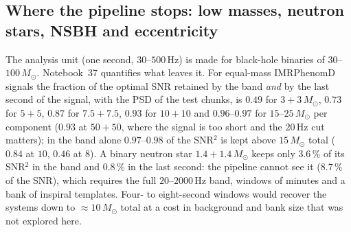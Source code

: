 \subsection{Where the pipeline stops: low masses, neutron stars, NSBH and eccentricity}\label{sec:limits}
The analysis unit (one second, $30$--$500\,$Hz) is made for black-hole binaries of $30$--$100\,M_\odot$. Notebook~37 quantifies what leaves it. For equal-mass IMRPhenomD signals the fraction of the optimal SNR retained by the band \emph{and} by the last second of the signal, with the PSD of the test chunks, is $0.49$ for $3+3\,M_\odot$, $0.73$ for $5+5$, $0.87$ for $7.5+7.5$, $0.93$ for $10+10$ and $0.96$--$0.97$ for $15$--$25\,M_\odot$ per component ($0.93$ at $50+50$, where the signal is too short and the $20\,$Hz cut matters); in the band alone $0.97$--$0.98$ of the SNR$^2$ is kept above $15\,M_\odot$ total ($0.84$ at $10$, $0.46$ at $8$). A binary neutron star $1.4+1.4\,M_\odot$ keeps only $3.6\,\%$ of its SNR$^2$ in the band and $0.8\,\%$ in the last second: the pipeline cannot see it ($8.7\,\%$ of the SNR), which requires the full $20$--$2000\,$Hz band, windows of minutes and a bank of inspiral templates. Four- to eight-second windows would recover the systems down to $\approx10\,M_\odot$ total at a cost in background and bank size that was not explored here.
\begin{table}[h]\centering\small
{}
\caption{$\snr_{50}$ at FAP $10^{-2}$ (single H1) for NSBH (BH $20$--$60\,M_\odot$, NS $1.2$--$2\,M_\odot$, $\Lambda=0$--$800$, aligned spin, IMRPhenomNSBH) and eccentric inspirals (EccentricFD, $15$--$40\,M_\odot$ total, inspiral only) against IMRPhenomD controls of the same mass ranges.}\label{tab:limits}
\end{table}
